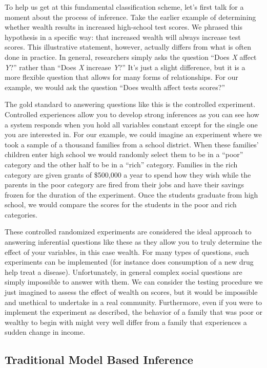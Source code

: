 \documentclass[]{memoir}
\begin{document}
To help us get at this fundamental classification scheme, let's first
talk for a moment about the process of inference. Take the earlier
example of determining whether wealth results in increased high-school
test scores. We phrased this hypothesis in a specific way: that
increased wealth will always increase test scores. This illustrative
statement, however, actually differs from what is often done in
practice. In general, researchers simply asks the question ``Does
\emph{X} affect \emph{Y}?'' rather than ``Does \emph{X} increase
\emph{Y}?'' It's just a slight difference, but it is a more flexible
question that allows for many forms of relationships. For our example,
we would ask the question ``Does wealth affect tests scores?''

The gold standard to answering questions like this is the controlled
experiment. Controlled experiences allow you to develop strong
inferences as you can see how a system responds when you hold all
variables constant except for the single one you are interested in. For
our example, we could imagine an experiment where we took a sample of a
thousand families from a school district. When these families' children
enter high school we would randomly select them to be in a ``poor''
category and the other half to be in a ``rich'' category. Families in
the rich category are given grants of \$500,000 a year to spend how they
wish while the parents in the poor category are fired from their jobs
and have their savings frozen for the duration of the experiment. Once
the students graduate from high school, we would compare the scores for
the students in the poor and rich categories.

These controlled randomized experiments are considered the ideal
approach to answering inferential questions like these as they allow you
to truly determine the effect of your variables, in this case wealth.
For many types of questions, such experiments can be implemented (for
instance does consumption of a new drug help treat a disease).
Unfortunately, in general complex social questions are simply impossible
to answer with them. We can consider the testing procedure we just
imagined to assess the effect of wealth on scores, but it would be
impossible and unethical to undertake in a real community. Furthermore,
even if you were to implement the experiment as described, the behavior
of a family that was poor or wealthy to begin with might very well
differ from a family that experiences a sudden change in income.

\subsection{Traditional Model Based Inference}
\end{document}
